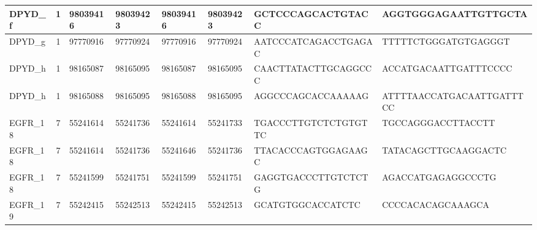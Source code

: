 \begin{landscape}
\begin{longtable}{| p{} | p{} | p{} | p{} | p{} | p{} | p{} | p{} |}
\multicolumn{1}{|l|}{DPYD\_f}    & \multicolumn{1}{c|}{1}  & \multicolumn{1}{l|}{98039416}  & \multicolumn{1}{l|}{98039423}  & \multicolumn{1}{l|}{98039416}  & \multicolumn{1}{l|}{98039423}  & \multicolumn{1}{l|}{GCTCCCAGCACTGTACC}               & \multicolumn{1}{l|}{AGGTGGGAGAATTGTTGCTA}          \\ \hline
\multicolumn{1}{|l|}{DPYD\_g}    & \multicolumn{1}{c|}{1}  & \multicolumn{1}{l|}{97770916}  & \multicolumn{1}{l|}{97770924}  & \multicolumn{1}{l|}{97770916}  & \multicolumn{1}{l|}{97770924}  & \multicolumn{1}{l|}{AATCCCATCAGACCTGAGAC}            & \multicolumn{1}{l|}{TTTTTCTGGGATGTGAGGGT}          \\ \hline
\multicolumn{1}{|l|}{DPYD\_h}    & \multicolumn{1}{c|}{1}  & \multicolumn{1}{l|}{98165087}  & \multicolumn{1}{l|}{98165095}  & \multicolumn{1}{l|}{98165087}  & \multicolumn{1}{l|}{98165095}  & \multicolumn{1}{l|}{CAACTTATACTTGCAGGCCC}            & \multicolumn{1}{l|}{ACCATGACAATTGATTTCCCC}         \\ \hline
\multicolumn{1}{|l|}{DPYD\_h}    & \multicolumn{1}{c|}{1}  & \multicolumn{1}{l|}{98165088}  & \multicolumn{1}{l|}{98165095}  & \multicolumn{1}{l|}{98165088}  & \multicolumn{1}{l|}{98165095}  & \multicolumn{1}{l|}{AGGCCCAGCACCAAAAAG}              & \multicolumn{1}{l|}{ATTTTAACCATGACAATTGATTTCC}     \\ \hline
\multicolumn{1}{|l|}{EGFR\_18}   & \multicolumn{1}{c|}{7}  & \multicolumn{1}{l|}{55241614}  & \multicolumn{1}{l|}{55241736}  & \multicolumn{1}{l|}{55241614}  & \multicolumn{1}{l|}{55241733}  & \multicolumn{1}{l|}{TGACCCTTGTCTCTGTGTTC}            & \multicolumn{1}{l|}{TGCCAGGGACCTTACCTT}            \\ \hline
\multicolumn{1}{|l|}{EGFR\_18}   & \multicolumn{1}{c|}{7}  & \multicolumn{1}{l|}{55241614}  & \multicolumn{1}{l|}{55241736}  & \multicolumn{1}{l|}{55241646}  & \multicolumn{1}{l|}{55241736}  & \multicolumn{1}{l|}{TTACACCCAGTGGAGAAGC}             & \multicolumn{1}{l|}{TATACAGCTTGCAAGGACTC}          \\ \hline
\multicolumn{1}{|l|}{EGFR\_18}   & \multicolumn{1}{c|}{7}  & \multicolumn{1}{l|}{55241599}  & \multicolumn{1}{l|}{55241751}  & \multicolumn{1}{l|}{55241599}  & \multicolumn{1}{l|}{55241751}  & \multicolumn{1}{l|}{GAGGTGACCCTTGTCTCTG}             & \multicolumn{1}{l|}{AGACCATGAGAGGCCCTG}            \\ \hline
\multicolumn{1}{|l|}{EGFR\_19}   & \multicolumn{1}{c|}{7}  & \multicolumn{1}{l|}{55242415}  & \multicolumn{1}{l|}{55242513}  & \multicolumn{1}{l|}{55242415}  & \multicolumn{1}{l|}{55242513}  & \multicolumn{1}{l|}{GCATGTGGCACCATCTC}               & \multicolumn{1}{l|}{CCCCACACAGCAAAGCA}             \\ \hline

\end{longtable}
\end{landscape}
